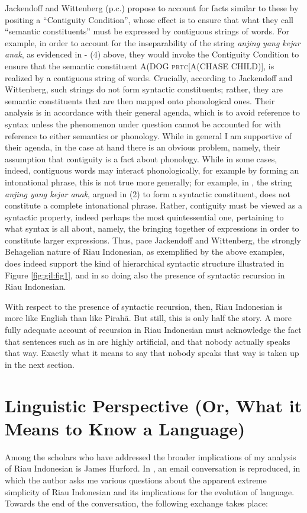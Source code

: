 \documentclass[output=paper,colorlinks,citecolor=brown
]{langscibook}
\begin{document}
Jackendoff and Wittenberg (p.c.) propose to account for facts similar to these by positing a ``Contiguity Condition'', whose effect is to ensure that what they call ``semantic constituents'' must be expressed by contiguous strings of words.  For example, in order to account for the inseparability of the string \emph{anjing yang kejar anak}, as evidenced in  - (4) above, they would invoke the Contiguity Condition to ensure that the semantic constituent A(DOG \textsc{prtc}[A(CHASE CHILD)], is realized by a contiguous string of words.  Crucially, according to Jackendoff and Wittenberg, such strings do not form syntactic constituents; rather, they are semantic constituents that are then mapped onto phonological ones.  Their analysis is in accordance with their general agenda, which is to avoid reference to syntax unless the phenomenon under question cannot be accounted for with reference to either semantics or phonology.  While in general I am supportive of their agenda, in the case at hand there is an obvious problem, namely, their assumption that contiguity is a fact about phonology.  While in some cases, indeed, contiguous words may interact phonologically, for example by forming an intonational phrase, this is not true more generally; for example, in , the string \emph{anjing yang kejar anak}, argued in (2) to form a syntactic constituent, does not constitute a complete intonational phrase.  Rather, contiguity must be viewed as a syntactic property, indeed perhaps the most quintessential one, pertaining to what syntax is all about, namely, the bringing together of expressions in order to constitute larger expressions.  Thus, pace Jackendoff and Wittenberg, the strongly Behagelian nature of Riau Indonesian, as exemplified by the above examples, does indeed support the kind of hierarchical syntactic structure illustrated in Figure \ref{fig:gil:fig1}, and in so doing also the presence of syntactic recursion in Riau Indonesian.

With respect to the presence of syntactic recursion, then, Riau Indonesian is more like English than like Pirahã.  But still, this is only half the story.  A more fully adequate account of recursion in Riau Indonesian must acknowledge the fact that sentences such as in  are highly artificial, and that nobody actually speaks that way.  Exactly what it means to say that nobody speaks that way is taken up in the next section.

\section{Linguistic Perspective (Or, What it Means to Know a Language)}
Among the scholars who have addressed the broader implications of my analysis of Riau Indonesian is James Hurford. In \citet[410-413]{hurford2011origins}, an email conversation is reproduced, in which the author asks me various questions about the apparent extreme simplicity of Riau Indonesian and its implications for the evolution of language.  Towards the end of the conversation, the following exchange takes place:
\end{document}
